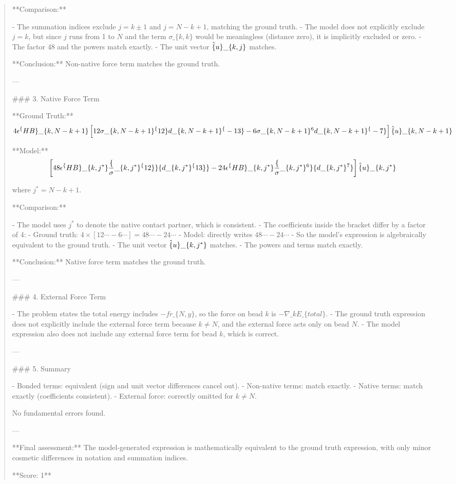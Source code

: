 \documentclass[10pt]{article}
\begin{document}
\begin{quote}
**Comparison:**

- The summation indices exclude \(j = k \pm 1\) and \(j = N-k+1\), matching the ground truth.
- The model does not explicitly exclude \(j = k\), but since \(j\) runs from 1 to \(N\) and the term \(\sigma\_\{k,k\}\) would be meaningless (distance zero), it is implicitly excluded or zero.
- The factor 48 and the powers match exactly.
- The unit vector \(\hat\{u\}\_\{k,j\}\) matches.

**Conclusion:** Non-native force term matches the ground truth.

---

\#\#\# 3. Native Force Term

**Ground Truth:**
\[
4 \epsilon^\{HB\}\_\{k, N-k+1\} \left[ 12 \sigma\_\{k, N-k+1\}^\{12\} d\_\{k, N-k+1\}^\{-13\} - 6 \sigma\_\{k, N-k+1\}^6 d\_\{k, N-k+1\}^\{-7\} \right] \hat\{u\}\_\{k, N-k+1\}
\]

**Model:**
\[
\left[ 48 \epsilon^\{HB\}\_\{k,j^*\} \frac\{\sigma\_\{k,j^*\}^\{12\}\}\{d\_\{k,j^*\}^\{13\}\} - 24 \epsilon^\{HB\}\_\{k,j^*\} \frac\{\sigma\_\{k,j^*\}^6\}\{d\_\{k,j^*\}^7\} \right] \hat\{u\}\_\{k,j^*\}
\]

where \(j^* = N-k+1\).

**Comparison:**

- The model uses \(j^*\) to denote the native contact partner, which is consistent.
- The coefficients inside the bracket differ by a factor of 4:
  - Ground truth: \(4 \times [12 \cdots - 6 \cdots] = 48 \cdots - 24 \cdots\)
  - Model: directly writes \(48 \cdots - 24 \cdots\)
- So the model's expression is algebraically equivalent to the ground truth.
- The unit vector \(\hat\{u\}\_\{k,j^*\}\) matches.
- The powers and terms match exactly.

**Conclusion:** Native force term matches the ground truth.

---

\#\#\# 4. External Force Term

- The problem states the total energy includes \(-f r\_\{N,y\}\), so the force on bead \(k\) is \(-\nabla\_k E\_\{total\}\).
- The ground truth expression does not explicitly include the external force term because \(k \neq N\), and the external force acts only on bead \(N\).
- The model expression also does not include any external force term for bead \(k\), which is correct.

---

\#\#\# 5. Summary

- Bonded terms: equivalent (sign and unit vector differences cancel out).
- Non-native terms: match exactly.
- Native terms: match exactly (coefficients consistent).
- External force: correctly omitted for \(k \neq N\).

No fundamental errors found.

---

**Final assessment:** The model-generated expression is mathematically equivalent to the ground truth expression, with only minor cosmetic differences in notation and summation indices.

**Score: 1**\end{quote}
\end{document}

